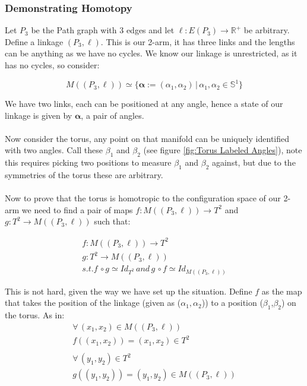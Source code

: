 \documentclass{article}
\begin{document}
\subsubsection{Demonstrating Homotopy}

Let $P_3$ be the Path graph with 3 edges and let $\ell: E(P_3) \rightarrow \mathbb R^+$ be arbitrary. Define a linkage $(P_3,\ell)$. This is our 2-arm, it has three links and the lengths can be anything as we have no cycles. We know our linkage is unrestricted, as it has no cycles, so consider:

$$M((P_3,\ell)) \simeq \{ \boldsymbol{\alpha} := (\alpha_1, \alpha_2) \, | \, \alpha_1, \alpha_2 \in \mathbb S^1 \}$$ 

\noindent We have two links, each can be positioned at any angle, hence a state of our linkage is given by $\boldsymbol{\alpha}$, a pair of angles. \\\\ Now consider the torus, any point on that manifold can be uniquely identified with two angles. Call these $\beta_1$ and $\beta_2$ (see figure \ref{fig:Torus Labeled Angles}), note this requires picking two positions to measure $\beta_1$ and $\beta_2$ against, but due to the symmetries of the torus these are arbitrary. \\\\ Now to prove that the torus is homotropic to the configuration space of our 2-arm we need to find a pair of maps $f: M((P_3,\ell)) \rightarrow T^2 $ and $g: T^2 \rightarrow M((P_3,\ell))$ such that:

\begin{gather*}
f: M((P_3,\ell)) \rightarrow T^2 \\
g: T^2 \rightarrow M((P_3,\ell)) \\
s.t. f \, \circ g \simeq Id_{T^2} \, and \, g \, \circ f \simeq Id_{M((P_3,\ell))}
\end{gather*}

\noindent This is not hard, given the way we have set up the situation. Define $f$ as the map that takes the position of the linkage (given as ($\alpha_1, \alpha_2$)) to a position ($\beta_1$,$\beta_2$) on the torus. As in: 
\begin{gather*}
\forall \, (x_1, x_2) \in M((P_3,\ell)) \\ f((x_1,x_2)) = (x_1,x_2) \in T^2 \\\\
\forall \, (y_1, y_2) \in T^2 \\ g((y_1,y_2)) = (y_1,y_2) \in M((P_3, \ell))
\end{gather*}
\end{document}
